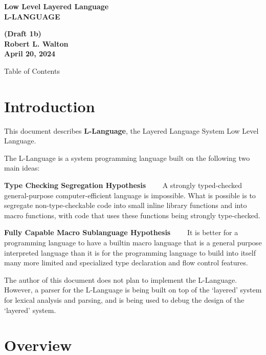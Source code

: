 \documentclass[12pt]{article}
\makeatletter
\renewcommand\tableofcontents{%
    \begin{list}{}%
	     {\setlength{\itemsep}{0in}%
	      \setlength{\topsep}{0in}%
	      \setlength{\parsep}{1ex}%
	      \setlength{\labelwidth}{0in}%
	      \setlength{\baselineskip}{1.5ex}%
	      \setlength{\leftmargin}{0.4in}%
	      \setlength{\rightmargin}{0.4in}}%
    \item\@starttoc{toc}%
    \end{list}}
\newcommand{\key}[1]{{\rm \bfseries #1}}
\newenvironment{indpar}[1][0.3in]%
	{\begin{list}{}%
		     {\setlength{\itemsep}{0in}%
		      \setlength{\topsep}{0in}%
		      \setlength{\parsep}{1ex}%
		      \setlength{\labelwidth}{#1}%
		      \setlength{\leftmargin}{#1}%
		      \addtolength{\leftmargin}{\labelsep}}%
	 \item}%
	{\end{list}}
\makeatother
\begin{document}
\begin{center}
\Large \bf
Low Level Layered Language\\[0.5ex]
\huge \bf
L-LANGUAGE
\end{center}
\begin{center}
\large \bf
(Draft 1b)
\\[0.5ex]
Robert L. Walton\\
April 20, 2024

\bigskip

Table of Contents
\end{center}

\bigskip

\tableofcontents

\newpage

\section{Introduction}

This document describes \key{L-Language}, the Layered Language
System Low Level Language.

The L-Language is a system programming language built on the
following two main ideas:

\begin{indpar}

\key{Type Checking Segregation Hypothesis}~~~~ A strongly typed-checked
general-purpose computer-efficient language is impossible.
What is possible is
to segregate non-type-checkable code into small inline
library functions and into macro functions,
with code that uses these functions being
strongly type-checked.

\key{Fully Capable Macro Sublanguage Hypothesis}~~~~ It is better for
a programming language to have a builtin macro language that
is a general purpose interpreted language than it is for the
programming language to build into itself
many more limited and specialized type declaration and
flow control features.

\end{indpar}

The author of this document does not plan to implement the L-Language.
However, a parser for the L-Language is being built on top of the
`layered' system for lexical analysis and parsing, and is being used
to debug the design of the `layered' system.

\section{Overview}
\end{document}
